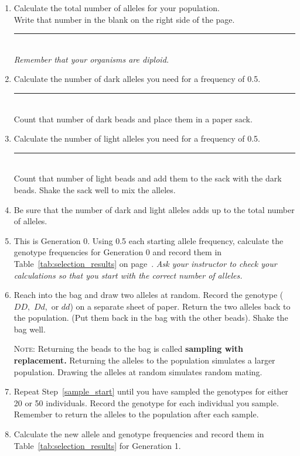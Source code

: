 \documentclass[12pt]{exam}
\newcommand{\allele}[1]{$#1$}
\begin{document}
\begin{enumerate}[resume]
	
	\item Calculate the total number of alleles for your population.\\
	Write that number in the blank on the right side of the page. 
	\hfill \rule{0.5in}{0.4pt}\\ \emph{Remember that your
		organisms are diploid.} 
	
	\item Calculate the number of dark alleles you need for a frequency of 0.5. 
	\hfill \rule{0.5in}{0.4pt} \\ Count that number of dark beads and place 
	them in a paper sack. 
	
	\item Calculate the number of light alleles you need for a frequency of 0.5.
	\hfill \rule{0.5in}{0.4pt} \\ Count that number of light beads and add 
	them to the sack with the dark beads. Shake the sack well to mix the alleles.
	
	\item Be sure that the number of dark and light alleles adds up to the 
	total number of alleles.
	
	\item This is Generation 0. Using 0.5 each starting allele frequency, 
	calculate the genotype frequencies for Generation 0 and record them in 
	Table~\ref{tab:selection_results} on page~\pageref{tab:selection_results}. 
	\emph{Ask your instructor to check your calculations so that you start with 
		the correct number of alleles.}
	
	\item \label{sample_start} Reach into the bag and draw two alleles 
	at random. Record the genotype (\allele{DD,} \allele{Dd,} or \allele{dd}) on 
	a separate sheet of paper. Return the two alleles back to the population. 
	(Put them back in the bag with the other beads). Shake the bag well.
	
	\textsc{Note:} Returning the beads to the bag is called \textbf{sampling with replacement.} 
	Returning the alleles to the population simulates a larger population. Drawing 
	the alleles at random simulates random mating.
	
	\item Repeat Step~\ref{sample_start} until you have sampled the genotypes 
	for either 20 or 50 individuals. Record the genotype for each individual you sample. 
	Remember to return the alleles to the population after each sample. 
	
	\item Calculate the new allele and genotype frequencies and record them in 
	Table~\ref{tab:selection_results} for Generation 1. 
	
\end{enumerate}
\end{document}
